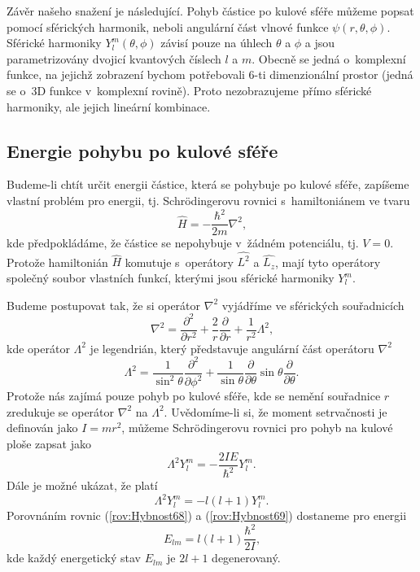 Závěr našeho snažení je následující. Pohyb částice po kulové sféře můžeme popsat pomocí sférických harmonik, neboli angulární část vlnové funkce $\psi(r,\theta,\phi)$. Sférické harmoniky $Y_l^{m}(\theta, \phi)$ závisí pouze na úhlech $\theta$ a $\phi$ a jsou parametrizovány dvojicí kvantových číslech $l$ a $m$. Obecně se jedná o~komplexní funkce, na jejichž zobrazení bychom potřebovali 6-ti dimenzionální prostor (jedná se o~3D funkce v~komplexní rovině). Proto nezobrazujeme přímo sférické harmoniky, ale jejich lineární kombinace.

\subsection{Energie pohybu po kulové sféře}
\label{kap:EnergiePohybSfera}

Budeme-li chtít určit energii částice, která se pohybuje po kulové sféře, zapíšeme vlastní problém pro energii, tj. Schrödingerovu rovnici s~hamiltoniánem ve tvaru
\begin{equation}
\hat{H} = -\frac{\hbar^2}{2m}\nabla^2 \mbox{,}
\label{rov:Hybnost65}
\end{equation}
kde předpokládáme, že částice se nepohybuje v~žádném potenciálu, tj. $V=0$. Protože hamiltonián $\hat{H}$ komutuje s~operátory $\hat{L^2}$ a $\hat{L_z}$, mají tyto operátory společný soubor vlastních funkcí, kterými jsou sférické harmoniky $Y_l^m$.

Budeme postupovat tak, že si operátor $\nabla^2$ vyjádříme ve sférických souřadnicích
\begin{equation}
\nabla^2 = \frac{\partial^2}{\partial r^2} + \frac{2}{r}\frac{\partial}{\partial r} + \frac{1}{r^2}\Lambda^2 \mbox{,}
\label{rov:Hybnost66}
\end{equation}
kde operátor $\Lambda^2$ je legendrián, který představuje angulární část operátoru $\nabla^2$
\begin{equation}
\Lambda^2 = \frac{1}{\sin^2 \theta}\frac{\partial^2}{\partial \phi^2} + \frac{1}{\sin \theta}\frac{\partial}{\partial \theta}\sin \theta \frac{\partial}{\partial \theta}\mbox{.}
\label{rov:Hybnost67}
\end{equation}
Protože nás zajímá pouze pohyb po kulové sféře, kde se nemění souřadnice $r$ zredukuje se operátor $\nabla^2$ na $\Lambda^2$. Uvědomíme-li si, že moment setrvačnosti je definován jako $I=mr^2$, můžeme Schrödingerovu rovnici pro pohyb na kulové ploše zapsat jako
\begin{equation}
\Lambda^2 Y_l^m = - \frac{2 I E}{\hbar^2} Y_l^m \mbox{.}
\label{rov:Hybnost68}
\end{equation}
Dále je možné ukázat, že platí 
\begin{equation}
\Lambda^2 Y_l^m = -l(l+1) Y_l^m \mbox{.}
\label{rov:Hybnost69}
\end{equation}
Porovnáním rovnic (\ref{rov:Hybnost68}) a (\ref{rov:Hybnost69}) dostaneme pro energii
\begin{equation}
\boxed{E_{lm} = l(l+1)\frac{\hbar^2}{2I} \mbox{,}}
\label{rov:Hybnost70}
\end{equation}
kde každý energetický stav $E_{lm}$ je $2l+1$ degenerovaný.